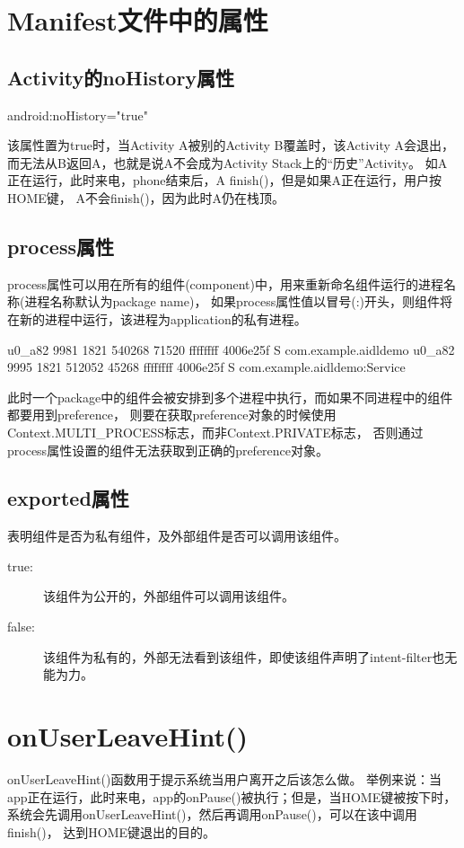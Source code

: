 ﻿\documentclass[a4paper,11pt]{article}
\begin{document}
  \section[Manifest文件中的属性]{Manifest文件中的属性}
  \subsection[Activity的noHistory属性]{Activity的noHistory属性}
  android:noHistory="true"

  该属性置为true时，当Activity A被别的Activity B覆盖时，该Activity A会退出，
  而无法从B返回A，也就是说A不会成为Activity Stack上的“历史”Activity。
  如A正在运行，此时来电，phone结束后，A finish()，但是如果A正在运行，用户按HOME键，
  A不会finish()，因为此时A仍在栈顶。

  \subsection[process属性]{process属性}
  process属性可以用在所有的组件(component)中，用来重新命名组件运行的进程名称(进程名称默认为package name)，
  如果process属性值以冒号(:)开头，则组件将在新的进程中运行，该进程为application的私有进程。\par
  \begin{bashcode}
u0_a82    9981  1821  540268 71520 ffffffff 4006e25f S com.example.aidldemo
u0_a82    9995  1821  512052 45268 ffffffff 4006e25f S com.example.aidldemo:Service
  \end{bashcode}

  此时一个package中的组件会被安排到多个进程中执行，而如果不同进程中的组件都要用到preference，
  则要在获取preference对象的时候使用Context.MULTI\_PROCESS标志，而非Context.PRIVATE标志，
  否则通过process属性设置的组件无法获取到正确的preference对象。

  \subsection[exported属性]{exported属性}
  表明组件是否为私有组件，及外部组件是否可以调用该组件。
  \begin{description}
    \item[true:] 该组件为公开的，外部组件可以调用该组件。
    \item[false:] 该组件为私有的，外部无法看到该组件，即使该组件声明了intent-filter也无能为力。
  \end{description}

  \section[onUserLeaveHint()]{onUserLeaveHint()}
  onUserLeaveHint()函数用于提示系统当用户离开之后该怎么做。
  举例来说：当app正在运行，此时来电，app的onPause()被执行；但是，当HOME键被按下时，
  系统会先调用onUserLeaveHint()，然后再调用onPause()，可以在该中调用finish()，
  达到HOME键退出的目的。
\end{document}

